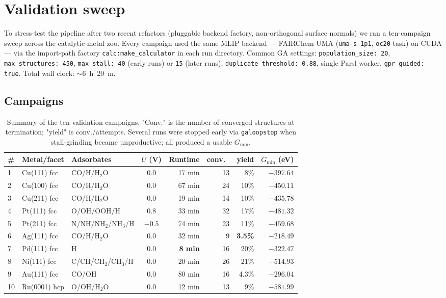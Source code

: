 \documentclass[11pt,letterpaper]{article}
\begin{document}
\section{Validation sweep}
\label{sec:sweep}

To stress-test the pipeline after two recent refactors (pluggable
backend factory, non-orthogonal surface normals) we ran a
ten-campaign sweep across the catalytic-metal zoo. Every campaign used
the same MLIP backend — FAIRChem UMA (\texttt{uma-s-1p1},
\texttt{oc20} task) on CUDA — via the import-path factory
\texttt{calc:make\_calculator} in each run directory. Common GA
settings: \texttt{population\_size: 20}, \texttt{max\_structures: 450},
\texttt{max\_stall: 40} (early runs) or \texttt{15} (later runs),
\texttt{duplicate\_threshold: 0.88}, single Parsl worker,
\texttt{gpr\_guided: true}. Total wall clock: $\sim$6~h~20~m.

\subsection{Campaigns}

\begin{table}[H]
\centering\small
\begin{tabular}{@{}lllcrrrr@{}}
\toprule
\# & Metal/facet & Adsorbates & $U$ (V) & Runtime & conv.\ & yield & $G_{\min}$ (eV) \\
\midrule
1  & Cu(111) fcc  & CO/H/H$_2$O           &  0.0 &  17 min &  13 &  8\%   & $-397.64$ \\
2  & Cu(100) fcc  & CO/H/H$_2$O           &  0.0 &  67 min &  24 & 10\%   & $-450.11$ \\
3  & Cu(211) fcc  & CO/H/H$_2$O           &  0.0 &  19 min &  14 & 10\%   & $-435.78$ \\
4  & Pt(111) fcc  & O/OH/OOH/H            &  0.8 &  33 min &  32 & 17\%   & $-481.32$ \\
5  & Pt(211) fcc  & N/NH/NH$_2$/NH$_3$/H  & $-0.5$ & 74 min  &  23 & 11\%   & $-459.68$ \\
6  & Ag(111) fcc  & CO/H/H$_2$O           &  0.0 &  32 min &   9 & \textbf{3.5\%} & $-218.49$ \\
7  & Pd(111) fcc  & H                      &  0.0 &  \textbf{8 min} & 16 & 20\%   & $-322.47$ \\
8  & Ni(111) fcc  & C/CH/CH$_2$/CH$_3$/H  &  0.0 &  20 min &  26 & 21\%   & $-514.93$ \\
9  & Au(111) fcc  & CO/OH                 &  0.0 &  80 min &  16 &  4.3\% & $-296.04$ \\
10 & Ru(0001) hcp & O/OH/H$_2$O           &  0.0 &  12 min &  13 &  9\%   & \textbf{$-581.99$} \\
\bottomrule
\end{tabular}
\caption{Summary of the ten validation campaigns. "Conv." is the
number of converged structures at termination; "yield" is
conv./attempts. Several runs were stopped early via
\texttt{galoopstop} when stall-grinding became unproductive; all
produced a usable $G_{\min}$.}
\label{tab:summary}
\end{table}
\end{document}
